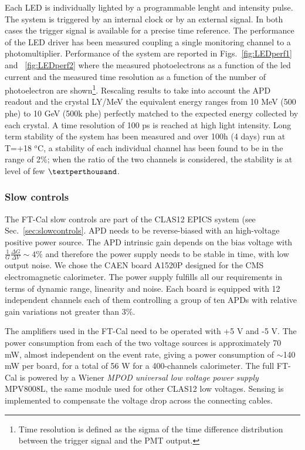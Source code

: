 Each LED is individually lighted by a programmable
lenght and intensity pulse. The
system is triggered by an internal clock or by
an external signal. In both cases the trigger
signal is available for a precise time reference.
The performance of the LED driver
has been measured coupling a single monitoring
channel to a photomultiplier. Performance of the system are reported in Figs.~\ref{fig:LEDperf1} and ~\ref{fig:LEDperf2} where the measured photoelectrons
as a function of the led current and the measured time resolution as
a function of the number of photoelectron are shown\footnote{Time resolution is defined as the sigma of the time difference distribution
between the trigger signal and the
PMT output.}. Rescaling
results to take into account the APD readout
and the crystal LY/MeV the equivalent
energy ranges from 10 MeV (500 phe) to 10
GeV (500k phe) perfectly matched to the expected
energy collected by each crystal. A time resolution
of 100 ps is reached at high light
intensity. Long term stability of the system has been measured and over 100h (4 days) run at
T=+18 $^o$C, a stability of each individual
channel has been found to be in the range of 2$\%$;  when the ratio
of the two channels is considered,
the stability is at level of few $\textperthousand$.

\subsubsection{Slow controls}
The FT-Cal slow controls are part of the CLAS12 EPICS system (see Sec.~\ref{sec:slowcontrols}.
APD  needs to be reverse-biased
with an high-voltage positive power
source. The APD intrinsic
gain depends on the bias voltage with
$\frac{1}{G}\frac{\Delta G}{\Delta V} \sim4 \%$
and therefore the power supply
needs to be stable in time, with low output
noise. We chose the CAEN board A1520P designed
for the CMS electromagnetic
calorimeter. The power supply fulfills  all our requirements in
terms of dynamic range, linearity and noise.
Each board is equipped with 12 independent
channels each of them controlling a group of ten APDs
 with relative
gain variations not greater than 3$\%$.

The amplifiers used in the FT-Cal need to
be operated with +5 V and -5 V.
The power consumption from
each of the two voltage sources is approximately
70 mW, almost independent on the
event rate, giving a power consumption of
$\sim$140 mW per board, for a total of 56 W for
a 400-channels calorimeter. 
The full FT-Cal is powered by a Wiener
{\it MPOD universal low voltage power supply} MPV8008L,
the same module used for other CLAS12 low voltages.
Sensing is implemented
to compensate the voltage drop across
the connecting cables.

